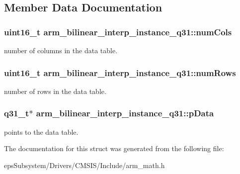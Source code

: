 \subsection{Member Data Documentation}
\hypertarget{structarm__bilinear__interp__instance__q31_a6c3eff4eb17ff1d43f170efb84713a2d}{
\subsubsection[{num\-Cols}]{\setlength{\rightskip}{0pt plus 5cm}uint16\-\_\-t arm\-\_\-bilinear\-\_\-interp\-\_\-instance\-\_\-q31\-::num\-Cols}}\label{structarm__bilinear__interp__instance__q31_a6c3eff4eb17ff1d43f170efb84713a2d}
number of columns in the data table. \hypertarget{structarm__bilinear__interp__instance__q31_a2082e3eac56354d75291f03e96ce4aa5}{
\subsubsection[{num\-Rows}]{\setlength{\rightskip}{0pt plus 5cm}uint16\-\_\-t arm\-\_\-bilinear\-\_\-interp\-\_\-instance\-\_\-q31\-::num\-Rows}}\label{structarm__bilinear__interp__instance__q31_a2082e3eac56354d75291f03e96ce4aa5}
number of rows in the data table. \hypertarget{structarm__bilinear__interp__instance__q31_a843eae0c9db5f815e77e1aaf9afea358}{
\subsubsection[{p\-Data}]{\setlength{\rightskip}{0pt plus 5cm}q31\-\_\-t$\ast$ arm\-\_\-bilinear\-\_\-interp\-\_\-instance\-\_\-q31\-::p\-Data}}\label{structarm__bilinear__interp__instance__q31_a843eae0c9db5f815e77e1aaf9afea358}
points to the data table. 

The documentation for this struct was generated from the following file\-:\begin{DoxyCompactItemize}
\item 
eps\-Subsystem/\-Drivers/\-C\-M\-S\-I\-S/\-Include/arm\-\_\-math.\-h\end{DoxyCompactItemize}
